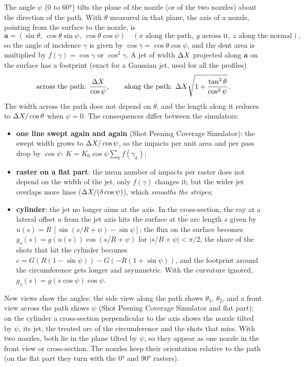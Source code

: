 The angle $\psi$ (0 to 60°) tilts the plane of the nozzle (or of the two nozzles) about the direction of the path. With $\theta$ measured in that plane, the axis of a nozzle, pointing from the surface to the nozzle, is
\begin{equation}
\mathbf a=(\sin\theta,\ \cos\theta\sin\psi,\ \cos\theta\cos\psi)\quad(x\text{ along the path},\ y\text{ across it},\ z\text{ along the normal}),
\end{equation}
so the angle of incidence $\gamma$ is given by $\cos\gamma=\cos\theta\cos\psi$, and the dent area is multiplied by $f(\gamma)=\cos\gamma$ or $\cos^2\gamma$. A jet of width $\Delta X$ projected along $\mathbf a$ on the surface has a footprint (exact for a Gaussian jet, used for all the profiles)
\begin{equation}
\text{across the path: } \frac{\Delta X}{\cos\psi},\qquad \text{along the path: } \Delta X\sqrt{1+\frac{\tan^2\theta}{\cos^2\psi}} .
\end{equation}
The width across the path does not depend on $\theta$, and the length along it reduces to $\Delta X/\cos\theta$ when $\psi=0$. The consequences differ between the simulators:
\begin{itemize}[nosep,leftmargin=*]
\item \textbf{one line swept again and again} (Shot Peening Coverage Simulator): the swept width grows to $\Delta X/\cos\psi$, so the impacts per unit area and per pass drop by $\cos\psi$: $K=K_0\cos\psi\sum_k f(\gamma_k)$;
\item \textbf{raster on a flat part}: the mean number of impacts per raster does not depend on the width of the jet, only $f(\gamma)$ changes it; but the wider jet overlaps more lines ($\Delta X/(\delta\cos\psi)$), which \emph{smooths the stripes};
\item \textbf{cylinder}: the jet no longer aims at the axis. In the cross-section, the ray at a lateral offset $u$ from the jet axis hits the surface at the arc length $s$ given by $u(s)=R\,[\sin(s/R+\psi)-\sin\psi]$; the flux on the surface becomes $g_s(s)=g(u(s))\cos(s/R+\psi)$ for $|s/R+\psi|<\pi/2$, the share of the shots that hit the cylinder becomes $c=G(R(1-\sin\psi))-G(-R(1+\sin\psi))$, and the footprint around the circumference gets longer and asymmetric. With the curvature ignored, $g_s(s)=g(s\cos\psi)\cos\psi$.
\end{itemize}
New views show the angles: the side view along the path shows $\theta_1$, $\theta_2$, and a front view across the path shows $\psi$ (Shot Peening Coverage Simulator and flat part); on the cylinder a cross-section perpendicular to the axis shows the nozzle tilted by $\psi$, its jet, the treated arc of the circumference and the shots that miss. With two nozzles, both lie in the plane tilted by $\psi$, so they appear as one nozzle in the front view or cross-section. The nozzles keep their orientation relative to the path (on the flat part they turn with the 0° and 90° rasters).
